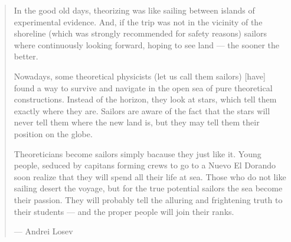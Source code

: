 
\cleardoublepage
\thispagestyle{empty}
{}

\vspace*{3cm}

\begin{quotation}

   \openquote In the good old days, theorizing was like sailing between islands of
   experimental evidence. And, if the trip was not in the vicinity of the
   shoreline (which was strongly recommended for safety reasons) sailors where
   continuously looking forward, hoping to see land --- the sooner the better.
   
   Nowadays, some theoretical physicists (let us call them sailors) [have]
   found a way to survive and navigate in the open sea of pure theoretical
   constructions. Instead of the horizon, they look at stars, which tell them
   exactly where they are. Sailors are aware of the fact that the stars will
   never tell them where the new land is, but they may tell them their position
   on the globe. 

   Theoreticians become sailors simply bacause they just like it. Young people,
   seduced by capitans forming crews to go to a Nuevo El Dorando \omissis{} soon
   realize that they will spend all their life at sea. Those who do not like
   sailing desert the voyage, but for the true potential sailors the sea become
   their passion. They will probably tell the alluring and frightening truth to
   their students --- and the proper people will join their ranks.~\closequote

   \begin{flushright}
      ---  Andrei Losev
   \end{flushright}

\end{quotation}

\medskip











